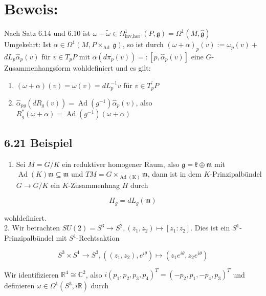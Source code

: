 \section*{Beweis:}
Nach Satz 6.14 und 6.10 ist $\omega-\tilde{\omega} \in \Omega_{\text {inv,hor }}^{1}(P, \mathfrak{g})=\Omega^{1}(M, \hat{\mathfrak{g}})$\\
Umgekehrt: Ist $\alpha \in \Omega^{1}\left(M, P \times_{\text {Ad }} \mathfrak{g}\right)$, so ist durch $(\omega+\alpha)_{p}(v):=\omega_{p}(v)+$ $d L_{p} \hat{\alpha}_{p}(v)$ für $v \in T_{p} P$ mit $\alpha\left(d \pi_{p}(v)\right)=:\left[p, \hat{\alpha}_{p}(v)\right]$ eine $G$-Zusammenhangsform wohldefiniert und es gilt:

\begin{enumerate}
  \item $(\omega+\alpha)(v)=\omega(v)=d L_{p}^{-1} v$ für $v \in T_{p}^{\prime} P$
  \item $\hat{\alpha}_{p g}\left(d R_{g}(v)\right)=\operatorname{Ad}\left(g^{-1}\right) \hat{\alpha}_{p}(v)$, also $R_{g}^{*}(\omega+\alpha)=\operatorname{Ad}\left(g^{-1}\right)(\omega+\alpha)$
\end{enumerate}

\subsection*{6.21 Beispiel}
\begin{enumerate}
  \item Sei $M=G / K$ ein reduktiver homogener Raum, also $\mathfrak{g}=\mathfrak{k} \oplus \mathfrak{m}$ mit $\operatorname{Ad}(K) \mathfrak{m} \subseteq \mathfrak{m}$ und $T M=G \times_{\operatorname{Ad}(\mathrm{K})} \mathfrak{m}$, dann ist in dem $K$-Prinzipalbündel $G \rightarrow G / K$ ein $K$-Zusammenhnag $H$ durch
\end{enumerate}

$$
H_{g}=d L_{g}(\mathfrak{m})
$$

wohldefiniert.\\
2. Wir betrachten $S U(2)=S^{3} \rightarrow S^{2},\left(z_{1}, z_{2}\right) \mapsto\left[z_{1}: z_{2}\right]$. Dies ist ein $S^{1}$-Prinzipalbündel mit $S^{1}$-Rechtsaktion

$$
S^{3} \times S^{1} \rightarrow S^{3},\left(\left(z_{1}, z_{2}\right), e^{i \theta}\right) \mapsto\left(z_{1} e^{i \theta}, z_{2} e^{i \theta}\right)
$$

Wir identifizieren $\mathbb{R}^{4} \cong \mathbb{C}^{2}$, also $i\left(p_{1}, p_{2}, p_{3}, p_{4}\right)^{T}=\left(-p_{2}, p_{1},-p_{4}, p_{3}\right)^{T}$ und definieren $\omega \in \Omega^{1}\left(S^{3}, i \mathbb{R}\right)$ durch

